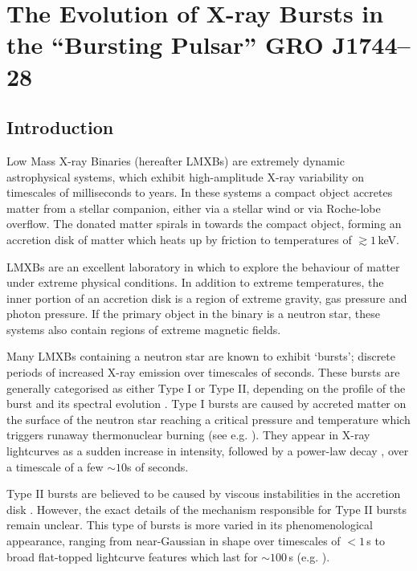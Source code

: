 
\chapter{The Evolution of X-ray Bursts in the ``Bursting Pulsar'' GRO J1744--28}

\section{Introduction}

\par Low Mass X-ray Binaries (hereafter LMXBs) are extremely dynamic astrophysical systems, which exhibit high-amplitude X-ray variability on timescales of milliseconds to years.  In these systems a compact object accretes matter from a stellar companion, either via a stellar wind or via Roche-lobe overflow.  The donated matter spirals in towards the compact object, forming an accretion disk of matter which heats up by friction to temperatures of $\gtrsim1$\,keV.
\par LMXBs are an excellent laboratory in which to explore the behaviour of matter under extreme physical conditions.  In addition to extreme temperatures, the inner portion of an accretion disk is a region of extreme gravity, gas pressure and photon pressure.  If the primary object in the binary is a neutron star, these systems also contain regions of extreme magnetic fields.
\par Many LMXBs containing a neutron star are known to exhibit `bursts'; discrete periods of increased X-ray emission over timescales of seconds.  These bursts are generally categorised as either Type I or Type II, depending on the profile of the burst and its spectral evolution \citep{Hoffman_RB,Lewin_Bursts}.  Type I bursts are caused by accreted matter on the surface of the neutron star reaching a critical pressure and temperature which triggers runaway thermonuclear burning (see e.g. \citealp{Lewin_Bursts,Strohmayer_TypeI}).  They appear in X-ray lightcurves as a sudden increase in intensity, followed by a power-law decay \citep{intZand_Decay}, over a timescale of a few $\sim10$s of seconds.
\par Type II bursts are believed to be caused by viscous instabilities in the accretion disk \citep{Lewin_TypeII}.  However, the exact details of the mechanism responsible for Type II bursts remain unclear.  This type of bursts is more varied in its phenomenological appearance, ranging from near-Gaussian in shape over timescales of $<1$\,s to broad flat-topped lightcurve features which last for $\sim100$\,s (e.g. \citealp{Bagnoli_PopStudy}).
